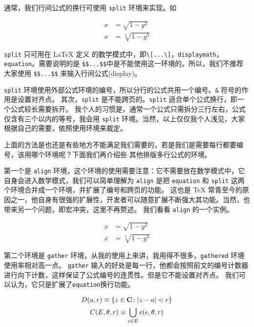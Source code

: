\jiejue


通常，我们行间公式的换行可使用 \verb|split| 环境来实现。如
\begin{example}
\[
\begin{split}
 x &= \sqrt   {1-y^2}\\
 x &= \sqrt[3]{1-y^3}
\end{split}
\]
\end{example}

\begin{note}
	\verb|split| 只可用在 \LaTeX{} 定义 的数学模式中，即\verb|\[...\]|，\verb|displaymath|，\verb|equation|。需要说明的是 \verb|$$...$$|中是不能使用这一环境的。所以，我们不推荐大家使用 \verb|$$...$$| 来输入行间公式(display)。
\end{note}
\begin{note}
	\verb|split| 环境使用外部公式环境的编号，所以分行的公式共用一个编号。\verb|&| 符号的作用是设置对齐点。
	其次，\verb|split| 是不能跨页的。\verb|split| 适合单个公式换行，即一个公式较长需要拆开。
	我个人的习惯是，通常一个公式只需拆分三行左右，公式仅含有三个以内的等号，我会用 \verb|split| 环境。当然，以上仅仅我个人浅见，大家根据自己的需要，依照使用环境来裁定。
\end{note}


上面的方法是也还是有些地方不能满足我们需要的，若是我们是需要每行都要编号，该用哪个环境呢？下面我们再介绍些
其他排版多行公式的环境。

第一个是 \verb|align| 环境，这个环境的使用需要注意：它不需要放在数学模式中，它自身会进入数学模式，我们可以简单理解为 \verb|align| 是把 \verb|equation| 和 \verb|split| 这两个环境合并成一个环境，并扩展了编号和跨页的功能。
这也是 \TeX{} 常青至今的原因之一，他自身有很强的扩展性，开发者可以随意扩展不断强大其功能。当然，也带来另一个问题，即宏冲突，这里不再赘述。
我们看看 \verb|align| 的一个实例。
\begin{example}
\begin{align}
 x &= \sqrt   {1-y^2}\\
 x &= \sqrt[3]{1-y^3}
\end{align}
\end{example}

第二个环境是 \verb|gather| 环境，从我的使用上来讲，我用得不很多，\verb|gathered| 环境使用率相对高一点。
\verb|gather| 输入的好处是每一行，他都会按照前文的编号计数器进行向下计数，这样保证了公式编号的连贯性。但是它不能设置对齐点。
我们可以认为，它只是扩展了\verb|equation|换行功能。
\begin{example}
\begin{gather}
 D(a,r) \equiv \{ z \in \mathbf{C}
 \colon \vert z - a\vert < r \}    \notag \\
 C (E, \theta, r) \equiv
 \bigcup_{e \in E} c (e, \theta, r)
\end{gather}
\end{example}

